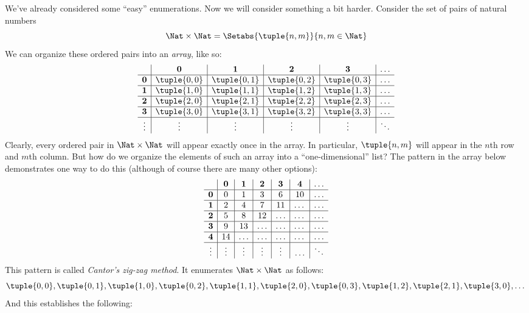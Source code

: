 \documentclass[../../../include/open-logic-section]{subfiles}
\begin{document}

\begin{explain}
We've already considered some ``easy'' enumerations. Now we will
consider something a bit harder. Consider the set of pairs of natural
numbers
\[
\Nat \times \Nat = \Setabs{\tuple{n,m}}{n,m \in \Nat}
\]
We can organize these ordered pairs into an \emph{array}, like so:
\[
\begin{array}{ c | c | c | c | c | c}
& \mathbf 0 & \mathbf 1 & \mathbf 2 & \mathbf 3 & \dots \\
\hline
\mathbf 0 & \tuple{0,0} & \tuple{0,1} & \tuple{0,2} & \tuple{0,3} & \dots \\
\hline
\mathbf 1 & \tuple{1,0} & \tuple{1,1} & \tuple{1,2} & \tuple{1,3} & \dots \\
\hline
\mathbf 2 & \tuple{2,0} & \tuple{2,1} & \tuple{2,2} & \tuple{2,3} & \dots \\
\hline
\mathbf 3 & \tuple{3,0} & \tuple{3,1} & \tuple{3,2} & \tuple{3,3} & \dots \\
\hline
\vdots & \vdots & \vdots & \vdots & \vdots & \ddots\\
\end{array}
\]
Clearly, every ordered pair in $\Nat \times \Nat$ will appear
exactly once in the array. In particular, $\tuple{n,m}$ will appear in
the $n$th row and $m$th column. But how do we organize the elements of
such an array into a ``one-dimensional'' list? The pattern in the array below
demonstrates one way to do this (although of course there are many other options):
\[
\begin{array}{ c | c | c | c | c | c | c}
& \mathbf 0 & \mathbf 1 & \mathbf 2 & \mathbf 3 & \mathbf 4 &\dots \\
\hline
\mathbf 0 & 0  & 1& 3 & 6& 10 &\ldots \\
\hline
\mathbf 1 &2 & 4& 7 & 11 & \dots &\ldots \\
\hline
\mathbf 2 & 5 & 8 & 12 & \ldots & \dots&\ldots \\
\hline
\mathbf 3 & 9 & 13 & \ldots & \ldots & \dots & \ldots \\
\hline
\mathbf 4 & 14 & \ldots & \ldots & \ldots & \dots & \ldots \\
\hline
\vdots & \vdots & \vdots & \vdots & \vdots&\ldots & \ddots\\
\end{array}
\]\noindent
This pattern is called \emph{Cantor's zig-zag method}. It  enumerates
$\Nat \times \Nat$ as follows:
\[
\tuple{0,0}, \tuple{0,1}, \tuple{1,0}, \tuple{0,2}, \tuple{1,1},
\tuple{2,0}, \tuple{0,3}, \tuple{1,2}, \tuple{2,1}, \tuple{3,0}, \dots
\]
And this establishes the following:
\end{explain}
\end{document}
